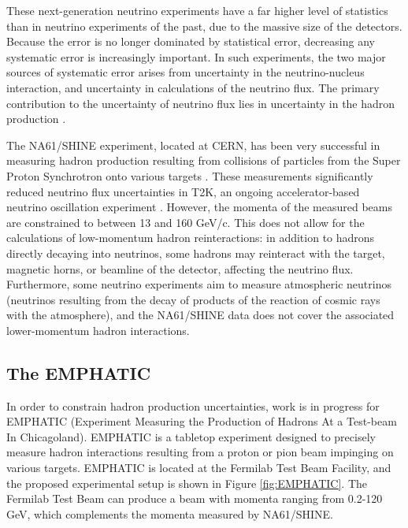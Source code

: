 These next-generation neutrino experiments have a far higher level of statistics than in neutrino experiments of the past, due to the massive size of the detectors.
Because the error is no longer dominated by statistical error, decreasing any systematic error is increasingly important.
In such experiments, the two major sources of systematic error arises from uncertainty in the neutrino-nucleus interaction, and uncertainty in calculations of the neutrino flux.
The primary contribution to the uncertainty of neutrino flux lies in uncertainty in the hadron production \cite{hyperKDesign}.

The NA61/SHINE experiment, located at CERN, has been very successful in measuring hadron production resulting from collisions of particles from the Super Proton Synchrotron onto various targets \cite{na61}.
These measurements significantly reduced neutrino flux uncertainties in T2K, an ongoing accelerator-based neutrino oscillation experiment \cite{na61T2K}. 
However, the momenta of the measured beams are constrained to between 13 and 160 GeV/c.
This does not allow for the calculations of low-momentum hadron reinteractions: in addition to hadrons directly decaying into neutrinos, some hadrons may reinteract with the target, magnetic horns, or beamline of the detector, affecting the neutrino flux.
Furthermore, some neutrino experiments aim to measure atmospheric neutrinos (neutrinos resulting from the decay of products of the reaction of cosmic rays with the atmosphere), and the NA61/SHINE data does not cover the associated lower-momentum hadron interactions.

 \subsection{The \ac{EMPHATIC}}

In order to constrain hadron production uncertainties, work is in progress for EMPHATIC (Experiment Measuring the Production of Hadrons At a Test-beam In Chicagoland).
EMPHATIC is a tabletop experiment designed to precisely measure hadron interactions resulting from a proton or pion beam impinging on various targets. 
EMPHATIC is located at the Fermilab Test Beam Facility, and the proposed experimental setup is shown in Figure \ref{fig:EMPHATIC}.
The Fermilab Test Beam can produce a beam with momenta ranging from 0.2-120 GeV, which complements the momenta measured by NA61/SHINE.

